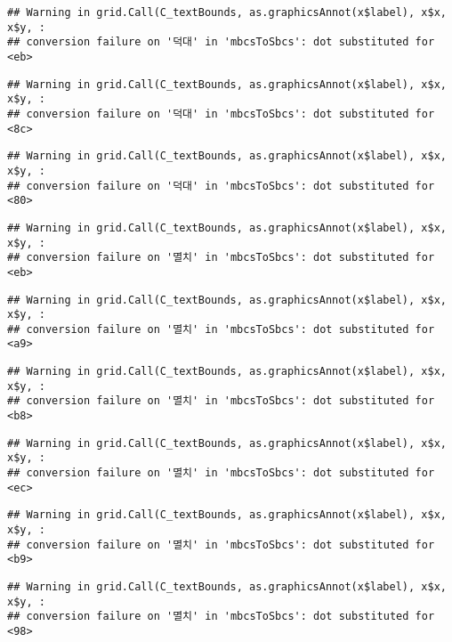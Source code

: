 \documentclass[
]{article}
\begin{document}
\begin{verbatim}
## Warning in grid.Call(C_textBounds, as.graphicsAnnot(x$label), x$x, x$y, :
## conversion failure on '덕대' in 'mbcsToSbcs': dot substituted for <eb>
\end{verbatim}

\begin{verbatim}
## Warning in grid.Call(C_textBounds, as.graphicsAnnot(x$label), x$x, x$y, :
## conversion failure on '덕대' in 'mbcsToSbcs': dot substituted for <8c>
\end{verbatim}

\begin{verbatim}
## Warning in grid.Call(C_textBounds, as.graphicsAnnot(x$label), x$x, x$y, :
## conversion failure on '덕대' in 'mbcsToSbcs': dot substituted for <80>
\end{verbatim}

\begin{verbatim}
## Warning in grid.Call(C_textBounds, as.graphicsAnnot(x$label), x$x, x$y, :
## conversion failure on '멸치' in 'mbcsToSbcs': dot substituted for <eb>
\end{verbatim}

\begin{verbatim}
## Warning in grid.Call(C_textBounds, as.graphicsAnnot(x$label), x$x, x$y, :
## conversion failure on '멸치' in 'mbcsToSbcs': dot substituted for <a9>
\end{verbatim}

\begin{verbatim}
## Warning in grid.Call(C_textBounds, as.graphicsAnnot(x$label), x$x, x$y, :
## conversion failure on '멸치' in 'mbcsToSbcs': dot substituted for <b8>
\end{verbatim}

\begin{verbatim}
## Warning in grid.Call(C_textBounds, as.graphicsAnnot(x$label), x$x, x$y, :
## conversion failure on '멸치' in 'mbcsToSbcs': dot substituted for <ec>
\end{verbatim}

\begin{verbatim}
## Warning in grid.Call(C_textBounds, as.graphicsAnnot(x$label), x$x, x$y, :
## conversion failure on '멸치' in 'mbcsToSbcs': dot substituted for <b9>
\end{verbatim}

\begin{verbatim}
## Warning in grid.Call(C_textBounds, as.graphicsAnnot(x$label), x$x, x$y, :
## conversion failure on '멸치' in 'mbcsToSbcs': dot substituted for <98>
\end{verbatim}
\end{document}

